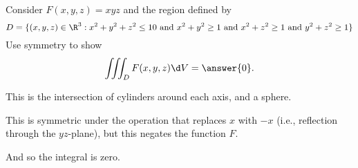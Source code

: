 \documentclass{ximera}
\author{Jim Fowler}
\begin{document}
\begin{exercise}
Consider $F(x,y,z) = xyz$ and the region defined by
$$
D = \{ (x,y,z) \in \R^3 : x^2 + y^2 + z^2 \leq 10 \mbox{ and } x^2 + y^2
\geq 1 \mbox{ and } x^2 + z^2 \geq 1 \mbox{ and } y^2 + z^2 \geq 1 \}
$$
Use symmetry to show
\[
  \iiint_D F(x,y,z) \d V = \answer{0}.
\]

\begin{hint}
  This is the intersection of cylinders around each axis, and a sphere.
\end{hint}
\begin{hint}
  This is symmetric under the operation that replaces $x$ with $-x$ (i.e., reflection through the $yz$-plane), but this negates the function $F$.
\end{hint}
\begin{hint}
And so the integral is zero.
\end{hint}
\end{exercise}
\end{document}
